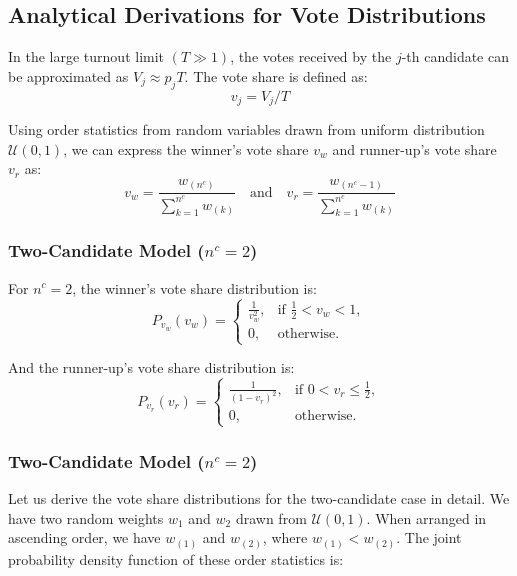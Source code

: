 \subsection{Analytical Derivations for Vote Distributions}

In the large turnout limit $(T \gg 1)$, the votes received by the $j$-th candidate can be approximated as $V_j \approx p_j T$. The vote share is defined as:
\begin{equation}
    v_j = V_j/T
\end{equation}

Using order statistics from random variables drawn from uniform distribution $\mathcal{U}(0,1)$, we can express the winner's vote share $v_w$ and runner-up's vote share $v_r$ as:
\begin{equation}
    v_w = \frac{w_{(n^c)}}{\sum_{k=1}^{n^c} w_{(k)}} \quad \text{and} \quad v_r = \frac{w_{(n^c-1)}}{\sum_{k=1}^{n^c} w_{(k)}}
\end{equation}

\subsubsection{Two-Candidate Model ($n^c = 2$)}
For $n^c = 2$, the winner's vote share distribution is:
\begin{equation}
P_{v_w}(v_w) = 
\begin{cases}
     \frac{1}{v_w^2}, & \text{if } \frac{1}{2} < v_w < 1,\\
     0, & \text{otherwise}.
\end{cases}
\end{equation}

And the runner-up's vote share distribution is:
\begin{equation}
P_{v_r}(v_r) = 
\begin{cases}
     \frac{1}{(1-v_r)^2}, & \text{if } 0 < v_r \leq \frac{1}{2},\\
     0, & \text{otherwise}.
\end{cases}
\end{equation}

\subsubsection{Two-Candidate Model ($n^c = 2$)}

Let us derive the vote share distributions for the two-candidate case in detail. We have two random weights $w_1$ and $w_2$ drawn from $\mathcal{U}(0,1)$. When arranged in ascending order, we have $w_{(1)}$ and $w_{(2)}$, where $w_{(1)} < w_{(2)}$. The joint probability density function of these order statistics is:

